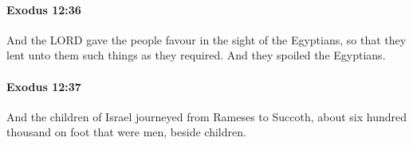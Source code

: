 		\paragraph{Exodus 12:36} %
			\label{EXODUS-12-36}

			And the LORD gave the people favour in the sight of the Egyptians, so that they lent unto them such things as they required. And they spoiled the Egyptians.


		\paragraph{Exodus 12:37} %
			\label{EXODUS-12-37}

			And the children of Israel journeyed from Rameses to Succoth, about six hundred thousand on foot that were men, beside children.


